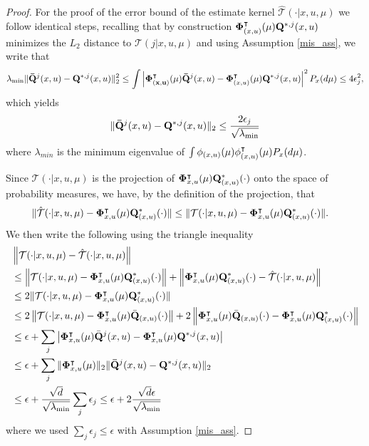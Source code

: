 \documentclass[twoside,11pt]{article}
\begin{document}
\begin{proof}
For the proof of the error bound of the estimate kernel $\hat{\mathcal{T}}(\cdot|x,u,\mu)$ we follow identical steps, recalling that by construction $  {\bf \Phi}_{(x,u)}^\intercal(\mu){\bf Q}^{*,j}{(x,u)}$ minimizes the $L_2$ distance to $\mathcal{T}(j|x,u,\mu)$ and using Assumption \ref{mis_ass}, we write that
\begin{align*}
 \lambda_{\min} \| {\bf \bar{Q}}^j{(x,u)} -  {\bf Q}^{*,j}{(x,u)}\|^2_2 \leq \int \left| {\bf \Phi^\intercal_{(x,u)}}(\mu) {\bf \bar{Q}}^j{(x,u)} -  {\bf \Phi}_{(x,u)}^\intercal(\mu) {\bf Q}^{*,j}{(x,u)}\right|^2 P_x(d\mu)\leq 4 \epsilon_j^2,
\end{align*}
which yields 
\begin{align*}
 \| {\bf \bar{Q}}^j{(x,u)} -  {\bf Q}^{*,j}{(x,u)}\|_2\leq \frac{2\epsilon_j}{\sqrt{\lambda_{\min}}}
\end{align*}
where $\lambda_{min}$ is the minimum eigenvalue of $\int {\bf \phi}_{(x,u)}(\mu){\bf \phi}_{(x,u)}^\intercal (\mu)P_x(d\mu)$. 

Since $\hat{\mathcal{T}}(\cdot|x,u,\mu)$ is the projection of ${\bf \Phi}_{x,u}^\intercal(\mu) {\bf Q}^*_{(x,u)}(\cdot)$ onto the space of probability measures, we have, by the definition of the projection, that
\begin{align*}
\|\hat{\mathcal{T}}(\cdot|x,u,\mu) - {\bf \Phi}_{x,u}^\intercal(\mu) {\bf Q}^*_{(x,u)}(\cdot)\|&\leq \|{\mathcal{T}}(\cdot|x,u,\mu) - {\bf \Phi}_{x,u}^\intercal(\mu) {\bf Q}^*_{(x,u)}(\cdot)\|.
\end{align*}
We then write the following using the triangle inequality
\begin{align*}
&\left\| \mathcal{T}(\cdot|x,u,\mu)-\hat{\mathcal{T}}(\cdot|x,u,\mu)\right\| \\ 
&\leq \left\| \mathcal{T}(\cdot|x,u,\mu)- {\bf \Phi}_{x,u}^\intercal(\mu) {\bf Q}^*_{(x,u)}(\cdot)\right\| + \left\|  {\bf \Phi}_{x,u}^\intercal(\mu) {\bf Q}^*_{(x,u)}(\cdot) - \hat{\mathcal{T}}(\cdot|x,u,\mu)\right\|\\
& \leq 2 \|{\mathcal{T}}(\cdot|x,u,\mu) - {\bf \Phi}_{x,u}^\intercal(\mu) {\bf Q}^*_{(x,u)}(\cdot)\|\\
&\leq 2 \left \|{\mathcal{T}}(\cdot|x,u,\mu) - {\bf \Phi}_{x,u}^\intercal(\mu) \bar{\bf Q}_{(x,u)}(\cdot) \right\| + 2 \left\|  {\bf \Phi}_{x,u}^\intercal(\mu) \bar{\bf Q}_{(x,u)}(\cdot) -  {\bf \Phi}_{x,u}^\intercal(\mu) {\bf Q}^*_{(x,u)}(\cdot)\right\|\\
&\leq \epsilon +  \sum_j \left|  {\bf \Phi}_{x,u}^\intercal(\mu) \bar{\bf Q}^j{(x,u)} -  {\bf \Phi}_{x,u}^\intercal(\mu) {\bf Q}^{*,j}{(x,u)}\right|\\
&\leq \epsilon +  \sum_j \| {\bf \Phi}_{x,u}^\intercal(\mu) \|_2  \| {\bf \bar{Q}}^j{(x,u)} -  {\bf Q}^{*,j}{(x,u)}\|_2\\
&\leq \epsilon +  \frac{\sqrt{d}}{\sqrt{\lambda_{\min}}} \sum_j {\epsilon_j} \leq \epsilon + 2 \frac{\sqrt{d} \epsilon}{\sqrt{\lambda_{\min}}}
\end{align*}
where we used $\sum_j\epsilon_j\leq \epsilon$ with Assumption \ref{mis_ass}.
\end{proof}
\end{document}
